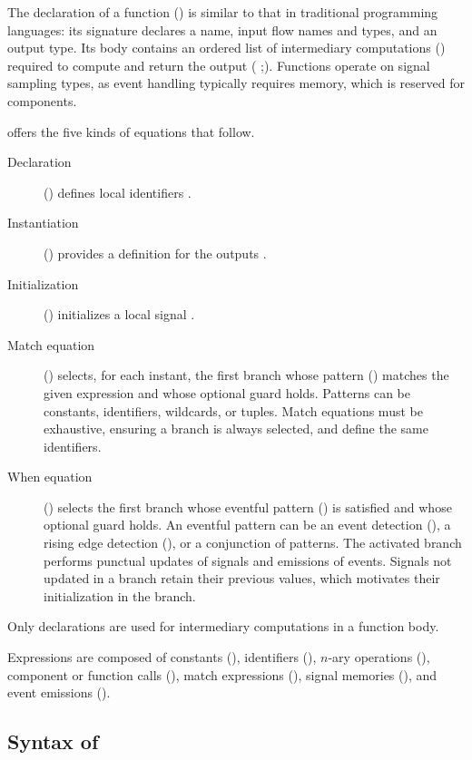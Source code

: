 The declaration of a function (\FunItem) is similar to that in traditional programming languages:
its signature declares a name, input flow names and types, and an output type. Its body contains an
ordered list of intermediary computations (\many{\Decl}) required to compute and return the output
( \Expr;). Functions operate on signal sampling types, as event handling typically
requires memory, which is reserved for components.

\GRSync offers the five kinds of equations that follow.
\begin{description}
    \item[Declaration] (\declEq{\many{(\ID:\STY)}}{\Expr}) defines local identifiers \many{\ID}.
    \item[Instantiation] () provides a definition for the outputs \many{\ID}.
    \item[Initialization] (\initEq{\ID}{\CST}) initializes a local signal \ID.
    \item[Match equation] (\matchX{\Expr}{\dots}) selects, for each instant, the first branch
          whose pattern (\Pat) matches the given expression and whose optional guard holds.
          Patterns can be constants, identifiers, wildcards, or tuples. Match equations must
          be exhaustive, ensuring a branch is always selected, and define the same identifiers.
    \item[When equation] (\whenEq{\initBr{\dots}}{\dots}) selects the first branch whose eventful
          pattern (\EPat) is satisfied and whose optional guard holds. An eventful pattern
          can be an event detection (\opt{\ID}), a rising edge detection (\Expr), or a
          conjunction of patterns. The activated branch performs punctual updates of signals
          and emissions of events. Signals not updated in a branch retain their previous
          values, which motivates their initialization in the  branch.
\end{description}
Only declarations are used for intermediary computations in a function body.

Expressions are composed of constants (\CST), identifiers (\ID), $n$-ary operations
(\opExpr{\many{\Expr}}), component or function calls (\appExpr{\ID}{\many{\Expr}}), match
expressions (\matchX{\Expr}{\dots}), signal memories (\lastExpr{\ID}), and event emissions
(\emitExpr{\Expr}).

\subsection{Syntax of \GReusot}
\label{sec:grust:syntax:greusot}

